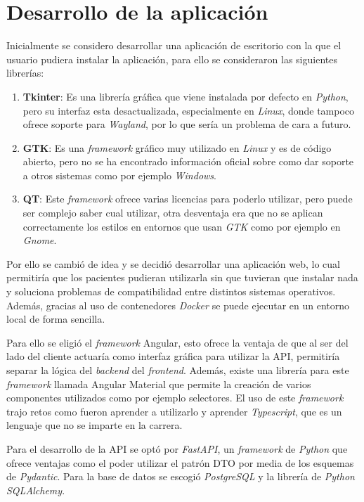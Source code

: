 \section{Desarrollo de la aplicación}
Inicialmente se considero desarrollar una aplicación de escritorio con la que el usuario pudiera instalar la aplicación, para ello se consideraron las siguientes librerías:
\begin{enumerate}
	\item \textbf{Tkinter}: Es una librería gráfica que viene instalada por defecto en \textit{Python}, pero su  interfaz esta desactualizada, especialmente en \textit{Linux}, donde tampoco ofrece soporte para \textit{Wayland}, por lo que sería un problema de cara a futuro.
	\item \textbf{GTK}: Es una \textit{framework} gráfico muy utilizado en \textit{Linux} y es de código abierto, pero no se ha encontrado información oficial sobre como dar soporte a otros sistemas como por ejemplo \textit{Windows}.
	\item \textbf{QT}: Este \textit{framework} ofrece varias licencias para poderlo utilizar, pero puede ser complejo saber cual utilizar, otra desventaja era que no se aplican correctamente los estilos en entornos que usan \textit{GTK} como por ejemplo en \textit{Gnome}.
\end{enumerate}
Por ello se cambió de idea y se decidió desarrollar una aplicación web, lo cual permitiría que los pacientes pudieran utilizarla sin que tuvieran que instalar nada y soluciona problemas de compatibilidad entre distintos sistemas operativos. Además, gracias al uso de contenedores \textit{Docker} se puede ejecutar en un entorno local de forma sencilla.

Para ello se eligió el \textit{framework} Angular, esto ofrece la ventaja de que al ser del lado del cliente actuaría como interfaz gráfica para utilizar la API, permitiría separar la lógica del \textit{backend} del \textit{frontend}. Además, existe una librería para este \textit{framework} llamada Angular Material que permite la creación de varios componentes utilizados como por ejemplo selectores. El uso de este \textit{framework} trajo retos como fueron aprender a utilizarlo y aprender \textit{Typescript}, que es un lenguaje que no se imparte en la carrera.

Para el desarrollo de la API se optó por \textit{FastAPI}, un \textit{framework} de \textit{Python} que ofrece ventajas como el poder utilizar el patrón DTO por media de los esquemas de \textit{Pydantic}. Para la base de datos se escogió \textit{PostgreSQL} y la librería de \textit{Python SQLAlchemy}. 

